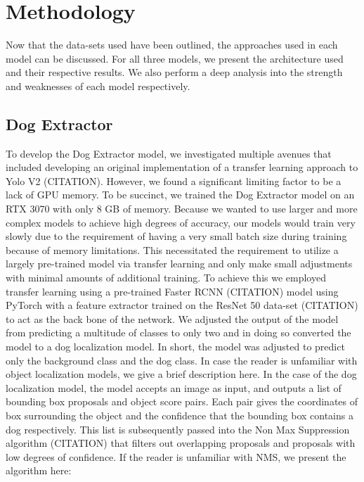 \documentclass{article}
\begin{document}
\section{Methodology}
Now that the data-sets used have been outlined, the approaches used in each model can be discussed.  For all three models, we present the architecture used and their respective results.  We also perform a deep analysis into the strength and weaknesses of each model respectively.  

\subsection{Dog Extractor}

To develop the Dog Extractor model, we investigated multiple avenues that included developing an original implementation of a transfer learning approach to Yolo V2 (CITATION).  However, we found a significant limiting factor to be a lack of GPU memory.  To be succinct, we trained the Dog Extractor model on an RTX 3070 with only 8 GB of memory.  Because we wanted to use larger and more complex models to achieve high degrees of accuracy, our models would train very slowly due to the requirement of having a very small batch size during training because of memory limitations.  This necessitated the requirement to utilize a largely pre-trained model via transfer learning and only make small adjustments with minimal amounts of additional training.  To achieve this we employed transfer learning using a pre-trained Faster RCNN (CITATION) model using PyTorch with a feature extractor trained on the ResNet 50 data-set (CITATION) to act as the back bone of the network.  We adjusted the output of the model from predicting a multitude of classes to only two and in doing so converted the model to a dog localization model.  In short, the model was adjusted to predict only the background class and the dog class.  In case the reader is unfamiliar with object localization models, we give a brief description here.  In the case of the dog localization model, the model accepts an image as input, and outputs a list of bounding box proposals and object score pairs.  Each pair gives the coordinates of box surrounding the object and the confidence that the bounding box contains a dog respectively.  This list is subsequently passed into the Non Max Suppression algorithm (CITATION) that filters out overlapping proposals and proposals with low degrees of confidence.  If the reader is unfamiliar with NMS, we present the algorithm here: \\
\end{document}
